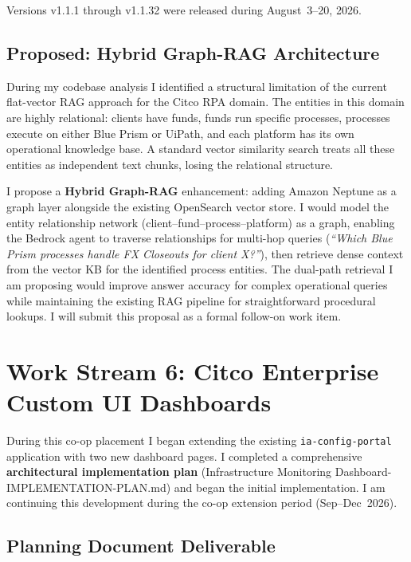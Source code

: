 Versions v1.1.1 through v1.1.32 were released during August~3--20, 2026.

\subsection{Proposed: Hybrid Graph-RAG Architecture}

During my codebase analysis I identified a structural limitation of
the current flat-vector RAG approach for the Citco RPA domain. The
entities in this domain are highly relational: clients have funds, funds
run specific processes, processes execute on either Blue Prism or UiPath,
and each platform has its own operational knowledge base. A standard
vector similarity search treats all these entities as independent text
chunks, losing the relational structure.

I propose a \textbf{Hybrid Graph-RAG} enhancement: adding Amazon Neptune
as a graph layer alongside the existing OpenSearch vector store. I would model the entity relationship network (client--fund--process--platform)
as a graph, enabling the Bedrock agent to traverse relationships for multi-hop queries
(\textit{``Which Blue Prism processes handle FX Closeouts for client X?''}),
then retrieve dense context from the vector KB for the identified process
entities. The dual-path retrieval I am proposing would improve answer accuracy for
complex operational queries while maintaining the existing RAG pipeline
for straightforward procedural lookups. I will submit this proposal
as a formal follow-on work item.

\FloatBarrier

\section{Work Stream 6: Citco Enterprise Custom UI Dashboards}
\label{sec:enterprise_ui_dashboards}


During this co-op placement I began extending the existing
\texttt{ia-config-portal} application with two new dashboard pages.
I completed a comprehensive \textbf{architectural implementation plan}
(Infrastructure Monitoring Dashboard-IMPLEMENTATION-PLAN.md) and began 
the initial implementation. I am continuing this development during the co-op
extension period (Sep--Dec~2026).

\subsection{Planning Document Deliverable}

